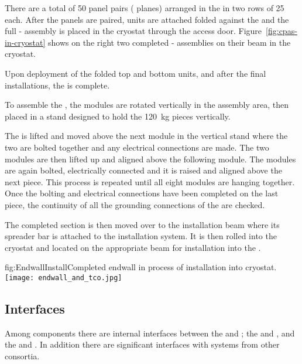 There are a total of 50  panel pairs ( planes) arranged in the %
 in two rows of 25 each.  After the panels are paired,  units are attached folded against the  and the full - assembly is placed in the  cryostat through the access door.  Figure~\ref{fig:cpas-in-cryostat} shows on the right two completed - assemblies on their beam in the  cryostat.


Upon deployment of the folded top and bottom  units, and after the final  installations, the   is complete.

To assemble the , the modules are rotated vertically in the assembly area, then placed in a stand designed to hold the \SI{120}{\kg} pieces vertically.

The  is lifted and moved above the next module in the vertical stand where the two are bolted together and any electrical connections are made. The two modules are then lifted up and aligned above the following module.  The modules are again bolted, electrically connected and it is raised and aligned above the next piece.  This process is repeated until all eight modules are hanging together.  Once the bolting and electrical connections have been completed on the last piece, the continuity of all the grounding connections of the  are checked.
 
The completed  section is then moved over to the installation beam where its spreader bar is attached to the installation system.  It is then rolled into the cryostat and located on the appropriate beam for installation into the .

\begin{dunefigure}{fig:EndwallInstall}{Completed endwall in process of installation into  cryostat.}
\texttt{[image: endwall\_and\_tco.jpg]}
\end{dunefigure}



\subsection{Interfaces}
\label{sec:fdsp-hv-interface}

Among  components there are internal interfaces between the  and ; the  and , and  the  and . In addition there are significant interfaces with systems from other consortia.

